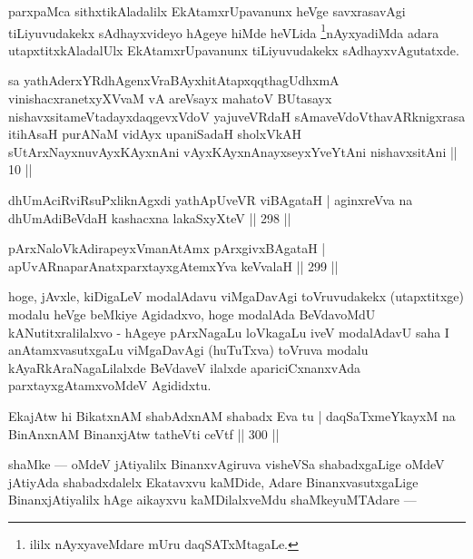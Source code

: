 \begin{artha}
parxpaMca sithxtikAladalilx EkAtamxrUpavanunx heVge savxrasavAgi tiLiyuvudakekx sAdhayxvideyo hAgeye hiMde heVLida \footnote{ililx nAyxyaveMdare mUru daqSATxMtagaLe.}nAyxyadiMda adara utapxtitxkAladalUlx EkAtamxrUpavanunx tiLiyuvudakekx sAdhayxvAgutatxde.
\end{artha}


\begin{kandikeshl}
sa yathAderxYRdhAgenxVraBAyxhitAtapxqqthagUdhxmA vinishacxranetxyXVvaM vA areV\s sayx mahatoV BUtasayx nishavxsitameVtadayxdaqgevxVdoV yajuveVRdaH sAmaveVdoV\s thavARknigxrasa itihAsaH purANaM vidAyx upaniSadaH sholxVkAH sUtArxNayxnuvAyxKAyxnAni vAyxKAyxnAnayxseyxYveYtAni nishavxsitAni || 10 ||
\end{kandikeshl}

\begin{shl}
dhUmAciRviRsuPxliknAgxdi yathApUveVR viBAgataH |
aginxreVva na dhUmAdiBeVdaH kashacxna lakaSxyXteV \hfill || 298 ||
\end{shl}

\begin{shl}
pArxNaloVkAdirapeyxVmanAtAmx pArxgivxBAgataH |
apUvARnaparAnatxparxtayxgAtemxYva keVvalaH \hfill || 299 ||
\end{shl}

\begin{artha}
hoge, jAvxle, kiDigaLeV modalAdavu viMgaDavAgi toVruvudakekx (utapxtitxge) modalu heVge beMkiye Agidadxvo, hoge modalAda BeVdavoMdU kANutitxralilalxvo - hAgeye pArxNagaLu loVkagaLu iveV modalAdavU saha I anAtamxvasutxgaLu viMgaDavAgi (huTuTxva) toVruva modalu kAyaRkAraNagaLilalxde BeVdaveV ilalxde apariciCxnanxvAda parxtayxgAtamxvoMdeV Agididxtu.
\end{artha}

\begin{shl}
EkajAtw hi BikatxnAM shabAdxnAM shabadx Eva tu |
daqSaTxmeYkayxM na BinAnxnAM BinanxjAtw tatheVti ceVtf \hfill || 300 ||
\end{shl}

\begin{artha}
shaMke  {\rm ---}  oMdeV jAtiyalilx BinanxvAgiruva visheVSa shabadxgaLige oMdeV jAtiyAda shabadxdalelx Ekatavxvu kaMDide, Adare BinanxvasutxgaLige BinanxjAtiyalilx hAge aikayxvu kaMDilalxveMdu shaMkeyuMTAdare  {\rm ---} 
\end{artha}

